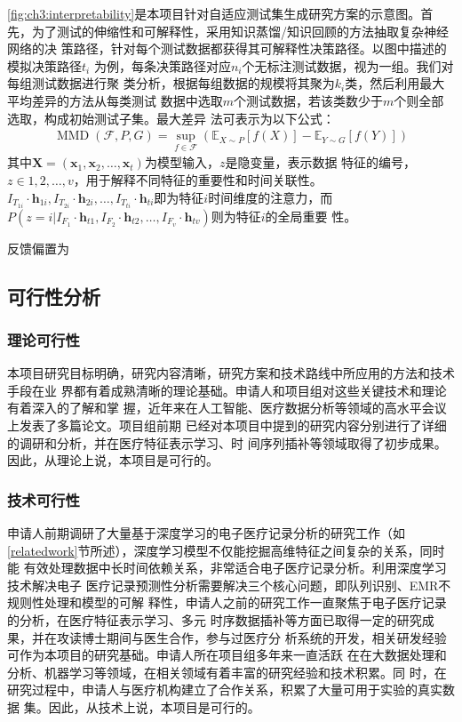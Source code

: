 \cref{fig:ch3:interpretability}是本项目针对自适应测试集生成研究方案的示意图。首
先，为了测试的伸缩性和可解释性，采用知识蒸馏/知识回顾的方法抽取复杂神经网络的决
策路径，针对每个测试数据都获得其可解释性决策路径。以图中描述的模拟决策路径$t_i$
为例，每条决策路径对应$n_i$个无标注测试数据，视为一组。我们对每组测试数据进行聚
类分析，根据每组数据的规模将其聚为$k_i$类，然后利用最大平均差异的方法从每类测试
数据中选取$m$个测试数据，若该类数少于$m$个则全部选取，构成初始测试子集。最大差异
法可表示为以下公式：
\begin{equation}
    \begin{aligned}
        \operatorname{MMD}(\mathcal{F}, P, G)=\sup _{f \in \mathcal{F}}\left(\mathbb{E}_{X \sim P}[f(X)]-\mathbb{E}_{Y \sim G}[f(Y)]\right)
    \end{aligned}
\end{equation}
其中$\bm X= (\bm x_1, \bm x_2, \dots, \bm x_t)$为模型输入，$z$是隐变量，表示数据
特征的编号，$z \in {1,2,\dots, v}$，用于解释不同特征的重要性和时间关联性。
$I_{T_{1i}} \cdot \bm h_{1i}, I_{T_{2i}} \cdot \bm h_{2i}, \dots, I_{T_{ti}}
\cdot \bm h_{ti}$即为特征$i$时间维度的注意力，而$P(z=i|I_{F_1} \cdot \bm h_{t1},
I_{F_2} \cdot \bm h_{t2}, \dots, I_{F_v} \cdot \bm h_{tv})$则为特征$i$的全局重要
性。

反馈偏置为

\subsection{可行性分析}

\subsubsection{理论可行性}

本项目研究目标明确，研究内容清晰，研究方案和技术路线中所应用的方法和技术手段在业
界都有着成熟清晰的理论基础。申请人和项目组对这些关键技术和理论有着深入的了解和掌
握，近年来在人工智能、医疗数据分析等领域的高水平会议上发表了多篇论文。项目组前期
已经对本项目中提到的研究内容分别进行了详细的调研和分析，并在医疗特征表示学习、时
间序列插补等领域取得了初步成果。因此，从理论上说，本项目是可行的。

\subsubsection{技术可行性}

申请人前期调研了大量基于深度学习的电子医疗记录分析的研究工作（如
\ref{relatedwork}节所述），深度学习模型不仅能挖掘高维特征之间复杂的关系，同时能
有效处理数据中长时间依赖关系，非常适合电子医疗记录分析。利用深度学习技术解决电子
医疗记录预测性分析需要解决三个核心问题，即队列识别、EMR不规则性处理和模型的可解
释性，申请人之前的研究工作一直聚焦于电子医疗记录的分析，在医疗特征表示学习、多元
时序数据插补等方面已取得一定的研究成果，并在攻读博士期间与医生合作，参与过医疗分
析系统的开发，相关研发经验可作为本项目的研究基础。申请人所在项目组多年来一直活跃
在在大数据处理和分析、机器学习等领域，在相关领域有着丰富的研究经验和技术积累。同
时，在研究过程中，申请人与医疗机构建立了合作关系，积累了大量可用于实验的真实数据
集。因此，从技术上说，本项目是可行的。

